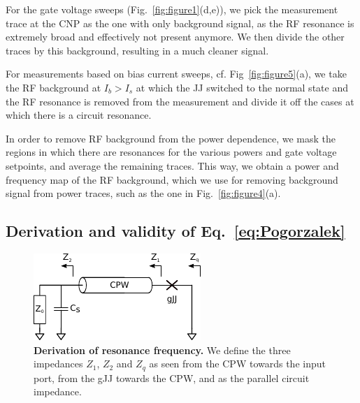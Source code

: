 For the gate voltage sweeps (Fig.~\ref{fig:figure1}(d,e)), we pick the measurement trace at the CNP as the one with only background signal, as the RF resonance is extremely broad and effectively not present anymore.
%
We then divide the other traces by this background, resulting in a much cleaner signal.

For measurements based on bias current sweeps, cf. Fig~\ref{fig:figure5}(a), we take the RF background at $I_b>I_s$ at which the JJ switched to the normal state and the RF resonance is removed from the measurement and divide it off the cases at which there is a circuit resonance.

In order to remove RF background from the power dependence, we mask the regions in which there are resonances for the various powers and gate voltage setpoints, and average the remaining traces.
%
This way, we obtain a power and frequency map of the RF background, which we use for removing background signal from power traces, such as the one in Fig.~\ref{fig:figure4}(a).

\subsection{Derivation and validity of Eq.~\ref{eq:Pogorzalek}}\label{sec:validity}

\begin{figure}
	\centering
	\includegraphics[width=0.5\linewidth]{chapter-gJJ-CPR/figs/rfderivation}
	\caption{
		\textbf{Derivation of resonance frequency.}
		We define the three impedances $Z_1$, $Z_2$ and $Z_q$ as seen from the CPW towards the input port, from the gJJ towards the CPW, and as the parallel circuit impedance.
	}
	\label{fig:rfderivation}
\end{figure}

